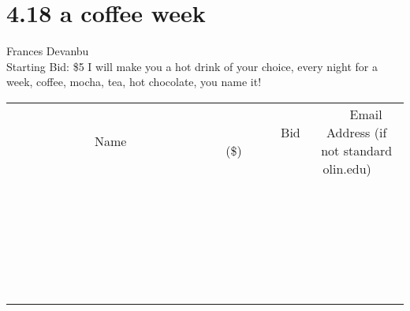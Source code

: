 \documentclass[11pt]{article}
\begin{document}
\section*{4.18 a coffee week}
Frances Devanbu
\\
Starting Bid: \$5
\newline
I will make you a hot drink of your choice, every night for a week, coffee, mocha, tea, hot chocolate, you name it!
\\[6ex]
\begin{tabular}{c c c}
~~~~~~~~~~~~~Name~~~~~~~~~~~~~ & ~~~~~~~~~Bid (\$)~~~~~~~~~  & ~~~Email Address (if not standard olin.edu)~~~\\
 & & \\
\hline
 & & \\
\hline
 & & \\
\hline
 & & \\
\hline
 & & \\
\hline
 & & \\
\hline
 & & \\
\hline
 & & \\
\hline
 & & \\
\hline
 & & \\
\hline
 & & \\
\hline
 & & \\
\hline
 & & \\
\hline
 & & \\
\hline
 & & \\
\hline
 & & \\
\hline
 & & \\
\hline
 & & \\
\hline
 & & \\
\hline
 & & \\
\hline
 & & \\
\hline
 & & \\
\hline
 & & \\
\hline
 & & \\
\hline
 & & \\
\hline
 & & \\
\hline
\end{tabular}
\newpage
\end{document}
